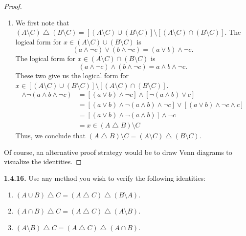 \documentclass[12pt]{amsart}
\newenvironment{statement}[1]{\smallskip\noindent\color[rgb]{.6627, .3529, .6314} {\bf #1.}}{}
\theoremstyle{definition}
\theoremstyle{remark}
\begin{document}
\begin{proof}
\begin{enumerate}
	\item We first note that $(A \setminus C) \bigtriangleup (B \setminus C) = [(A \setminus C) \cup (B \setminus C)] \setminus [(A \setminus C) \cap (B \setminus C)]$.
	The logical form for $x \in (A \setminus C) \cup (B \setminus C)$ is
	\begin{equation*}
		(a \wedge \neg c) \vee (b \wedge \neg c)
		= (a \vee b) \wedge \neg c.
	\end{equation*}
	The logical form for $x \in (A \setminus C) \cap (B \setminus C)$ is
	\begin{equation*}
		(a \wedge \neg c) \wedge (b \wedge \neg c)
		= a \wedge b \wedge \neg c.
	\end{equation*}
	These two give us the logical form for $x \in   [(A \setminus C) \cup (B \setminus C)] \setminus [(A \setminus C) \cap (B \setminus C)]$.
	\begin{align*}
		[(a \vee b) \wedge \neg c] \wedge \neg (a \wedge b \wedge \neg c)
		&= [(a \vee b) \wedge \neg c] \wedge [\neg (a \wedge b) \vee c] \\
		&= [(a \vee b) \wedge \neg (a \wedge b) \wedge \neg c] \vee [(a \vee b) \wedge \neg c \wedge c] \\
		&= [(a \vee b) \wedge \neg (a \wedge b)] \wedge \neg c \\
		&= x \in (A \bigtriangleup B) \setminus C
	\end{align*}
	Thus, we conclude that $(A \bigtriangleup B) \setminus C = (A \setminus C) \bigtriangleup (B \setminus C)$.
\end{enumerate}
Of course, an alternative proof strategy would be to draw Venn diagrams to visualize the identities.
\end{proof}


\begin{statement}{1.4.16}
Use any method you wish to verify the following identities:
\begin{enumerate}
	\item $(A \cup B) \bigtriangleup C = (A \bigtriangleup C) \bigtriangleup (B \setminus A)$.
	\item $(A \cap B) \bigtriangleup C = (A \bigtriangleup C) \bigtriangleup (A \setminus B)$.
	\item $(A \setminus B) \bigtriangleup C = (A \bigtriangleup C) \bigtriangleup (A \cap B)$.
\end{enumerate}
\end{statement}
\end{document}
